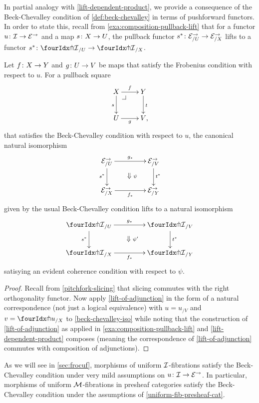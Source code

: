 \documentclass[reqno,10pt,a4paper,oneside,draft]{amsart}
\begin{document}
In partial analogy with \cref{lift-dependent-product}, we provide a consequence of the Beck-Chevalley condition of \cref{def:beck-chevalley} in terms of pushforward functors.
In order to state this, recall from \cref{exa:composition-pullback-lift} that for a functor $u \co \cal{I} \to \catE^\to$ and a map $s \co X \to U$, the pullback functor $s^* \co \catE^\to_{/U} \to \catE^\to_{/X}$ lifts to a functor $s^* \co {\liftr{\cal{I}}}_{/U} \to {\liftr{\cal{I}}}_{/X}$.

\begin{proposition} \label{lift-pushforward-BC}
Let $f \co X \to Y$ and $g \co U \to V$ be maps that satisfy the Frobenius condition with respect to $u$.
For a pullback square
\[
\xymatrix{
  X
  \ar[r]^{f}
  \ar[d]_{s}
  \pullback{dr}
&
  Y
  \ar[d]^{t}
\\
  U
  \ar[r]_{g}
&
  V
\rlap{,}}
\]
that satisfies the Beck-Chevalley condition with respect to $u$, the canonical natural isomorphism
\[
\xymatrix@C+2em{
  \catE^\to_{/U}
  \ar[r]^{g_*}
  \ar[d]_{s^*}
  \ar@{}[dr]|{\textstyle\Downarrow \rlap{$\labelstyle\psi$}}
&
  \catE^\to_{/V}
  \ar[d]^{t^*}
\\
  \catE^\to_{/X}
  \ar[r]_{f_*}
&
  \catE^\to_{/Y}
}
\]
given by the usual Beck-Chevalley condition lifts to a natural isomorphism
\[
\xymatrix@C+2em{
  {\liftr{\cal{I}}}_{/U}
  \ar[r]^{g_*}
  \ar[d]_{s^*}
  \ar@{}[dr]|{\textstyle\Downarrow \rlap{$\labelstyle\psi'$}}
&
  {\liftr{\cal{I}}}_{/V}
  \ar[d]^{t^*}
\\
  {\liftr{\cal{I}}}_{/X}
  \ar[r]_{f_*}
&
  {\liftr{\cal{I}}}_{/Y}
}
\]
satisying an evident coherence condition with respect to $\psi$.
\end{proposition}

\begin{proof}
Recall from \cref{pitchfork-slicing} that slicing commutes with the right orthogonality functor.
Now apply \cref{lift-of-adjunction} in the form of a natural correspondence (not just a logical equivalence) with $u = u_{/V}$ and $v = \liftr{u}_{/X}$ to \cref{beck-chevalley-iso} while noting that the construction of \cref{lift-of-adjunction} as applied in \cref{exa:composition-pullback-lift} and \cref{lift-dependent-product} composes (meaning the correspondence of \cref{lift-of-adjunction} commutes with composition of adjunctions).
\end{proof}

As we will see in \cref{sec:frocuf}, morphisms of uniform $\cal{I}$-fibrations satisfy the Beck-Chevalley condition under very mild assumptions on $u \co \cal{I} \to \catE^\to$.
In particular, morphisms of uniform $\cal{M}$-fibrations in presheaf categories satisfy the Beck-Chevalley condition under the assumptions of \cref{uniform-fib-presheaf-cat}.
\end{document}
